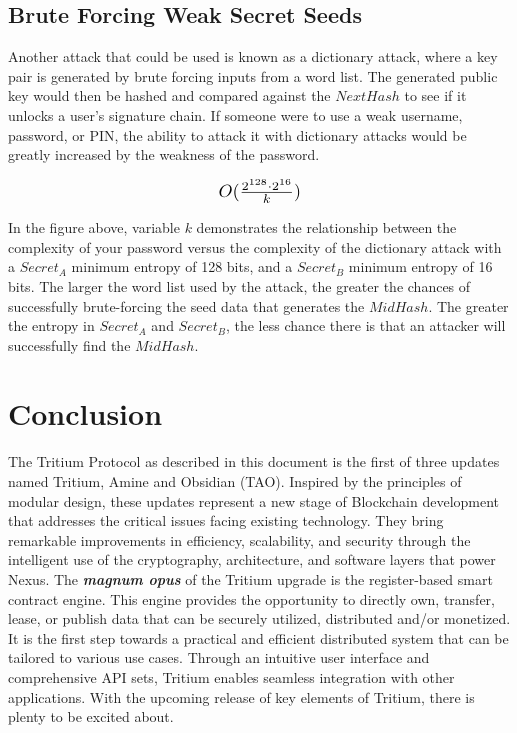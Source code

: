 \documentclass[11pt]{article}
\begin{document}
\subsection{Brute Forcing Weak Secret Seeds}

Another attack that could be used is known as a dictionary attack, where a key pair is generated by brute forcing inputs from a word list.
The generated public key would then be hashed and compared against the $NextHash$ to see if it unlocks a user's signature chain.
If someone were to use a weak username, password, or PIN, the ability to attack it with dictionary attacks would be greatly increased by the weakness of the password. 

\begin{equation}
\label{eq: Iterations to Dictionary Attack}
\resizebox{.17\hsize}{!}
{$
O(\frac{2^{128} \cdot 2^{16}}{k})
$}
\end{equation}

\noindent In the figure above, variable $k$ demonstrates the relationship between the complexity of your password versus the complexity of the dictionary attack with a $Secret_{A}$ minimum entropy of 128 bits, and a $Secret_{B}$ minimum entropy of 16 bits.
The larger the word list used by the attack, the greater the chances of successfully brute-forcing the seed data that generates the $MidHash$.
The greater the entropy in $Secret_{A}$ and $Secret_{B}$, the less chance there is that an attacker will successfully find the $MidHash$.


\section{Conclusion}

The Tritium Protocol as described in this document is the first of three updates named Tritium, Amine and Obsidian (TAO).
Inspired by the principles of modular design, these updates represent a new stage of Blockchain development that addresses the critical issues facing existing technology. 
They bring remarkable improvements in efficiency, scalability, and security through the intelligent use of the cryptography, architecture, and software layers that power Nexus.
The \textit{\textbf{magnum opus}} of the Tritium upgrade is the register-based smart contract engine.
This engine provides the opportunity to directly own, transfer, lease, or publish data that can be securely utilized, distributed and/or monetized.
It is the first step towards a practical and efficient distributed system that can be tailored to various use cases. Through an intuitive user interface and comprehensive API sets, Tritium enables seamless integration with other applications.
With the upcoming release of key elements of Tritium, there is plenty to be excited about.
\end{document}
